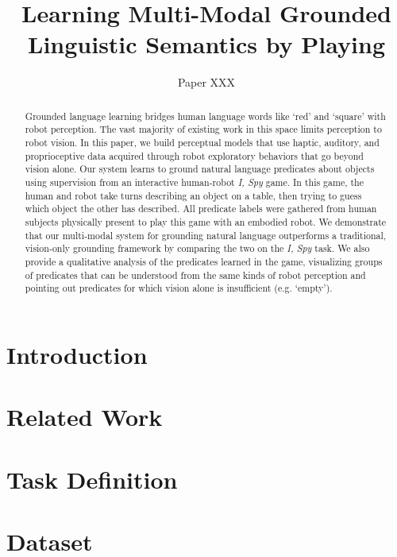 \documentclass{article}
\title{Learning Multi-Modal Grounded Linguistic Semantics by Playing \ispy}
\author{Paper XXX}
\newcommand{\ispy}{\textit{I, Spy}\xspace}
\begin{document}
\maketitle

\begin{abstract}
Grounded language learning bridges human language words like `red' and `square' with robot perception.
The vast majority of existing work in this space limits perception to robot vision.
In this paper, we build perceptual models that use haptic, auditory, and proprioceptive data acquired through robot exploratory behaviors that go beyond vision alone.
Our system learns to ground natural language predicates about objects using supervision from an interactive human-robot \ispy game.
In this game, the human and robot take turns describing an object on a table, then trying to guess which object the other has described.
All predicate labels were gathered from human subjects physically present to play this game with an embodied robot.
We demonstrate that our multi-modal system for grounding natural language outperforms a traditional, vision-only grounding framework by comparing the two on the \ispy task.
We also provide a qualitative analysis of the predicates learned in the game, visualizing groups of predicates that can be understood from the same kinds of robot perception and pointing out predicates for which vision alone is insufficient (e.g. `empty').
\end{abstract}

\section{Introduction}
\label{sec:introduction}
	

\section{Related Work}
\label{sec:relatedwork}
	

\section{Task Definition}
\label{sec:taskdefinition}
	

\section{Dataset}
\label{sec:dataset}
	
\end{document}
